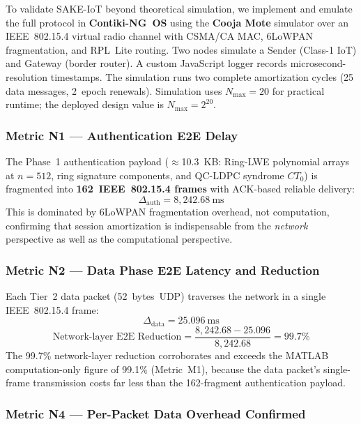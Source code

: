 \documentclass[conference]{IEEEtran}
\newcommand{\Nmax}{N_{\max}}
\begin{document}
To validate SAKE-IoT beyond theoretical simulation, we implement and
emulate the full protocol in \textbf{Contiki-NG~OS} using the
\textbf{Cooja Mote} simulator over an IEEE~802.15.4 virtual radio
channel with CSMA/CA MAC, 6LoWPAN fragmentation, and RPL~Lite routing.
Two nodes simulate a Sender (Class-1 IoT) and Gateway (border router).
A custom JavaScript logger records microsecond-resolution timestamps. The
simulation runs two complete amortization cycles (25 data messages,
2~epoch renewals). Simulation uses $\Nmax{=}20$ for practical runtime;
the deployed design value is $\Nmax{=}2^{20}$.

\subsubsection*{Metric N1 --- Authentication E2E Delay}

The Phase~1 authentication payload ($\approx$10.3~KB: Ring-LWE
polynomial arrays at $n{=}512$, ring signature components, and
QC-LDPC syndrome $CT_0$) is fragmented into \textbf{162~IEEE~802.15.4
frames} with ACK-based reliable delivery:
\begin{equation}
\Delta_{\text{auth}} = 8{,}242.68~\text{ms}
\label{eq:authdelay}
\end{equation}
This is dominated by 6LoWPAN fragmentation overhead, not computation,
confirming that session amortization is indispensable from the
\emph{network} perspective as well as the computational perspective.

\subsubsection*{Metric N2 --- Data Phase E2E Latency and Reduction}

Each Tier~2 data packet (52~bytes~UDP) traverses the network in a
single IEEE~802.15.4 frame:
\begin{equation}
\Delta_{\text{data}} = 25.096~\text{ms}
\label{eq:datadelay}
\end{equation}
\begin{equation}
\text{Network-layer E2E Reduction} =
\frac{8{,}242.68 - 25.096}{8{,}242.68} = \mathbf{99.7\%}
\label{eq:e2ered}
\end{equation}
The 99.7\% network-layer reduction corroborates and exceeds the
MATLAB computation-only figure of 99.1\% (Metric~M1), because the
data packet's single-frame transmission costs far less than the
162-fragment authentication payload.

\subsubsection*{Metric N4 --- Per-Packet Data Overhead Confirmed}
\end{document}

